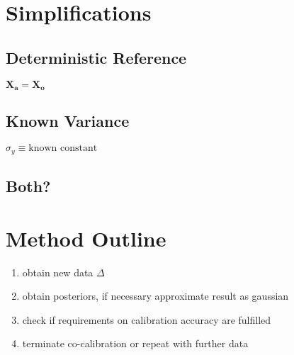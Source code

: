 \documentclass[10pt]{article}
\renewcommand{\vec}[1]{\boldsymbol{#1}}
\begin{document}
    
\section{Simplifications}

\subsection{Deterministic Reference}
$\vec{X_a} = \vec{X_o}$

\subsection{Known Variance}
$\sigma_y \equiv \text{known constant}$

\subsection{Both?}


\section{Method Outline}
\begin{enumerate}
    \item obtain new data $\Delta$
    \item obtain posteriors, if necessary approximate result as gaussian
    \item check if requirements on calibration accuracy are fulfilled
    \item terminate co-calibration or repeat with further data
\end{enumerate}



    
\end{document}
